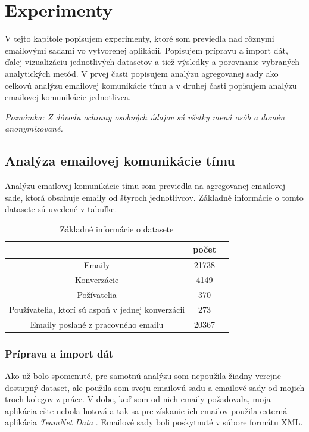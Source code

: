 \documentclass[slovak,master,public,dept460,male,cpdeclaration,oneside]{diploma}
\begin{document}
\section{Experimenty}
V tejto kapitole popisujem experimenty, ktoré som previedla nad rôznymi emailovými sadami vo vytvorenej aplikácii. Popisujem prípravu a import dát, ďalej vizualizáciu jednotlivých datasetov a tiež výsledky a porovnanie vybraných analytických metód. V prvej časti popisujem analýzu agregovanej sady ako celkovú analýzu emailovej komunikácie tímu a v druhej časti popisujem analýzu emailovej komunikácie jednotlivca.

\noindent \textit{Poznámka: Z dôvodu ochrany osobných údajov sú všetky mená osôb a domén anonymizované.}


\subsection{Analýza emailovej komunikácie tímu}

Analýzu emailovej komunikácie tímu som previedla na agregovanej emailovej sade, ktorá obsahuje emaily od štyroch jednotlivcov. Základné informácie o tomto datasete sú uvedené v tabuľke. 

\begin{table}[h!]
\centering
\begin{tabular}{ c c c }
  &  počet \\ 
 \hline
 Emaily  & 21738 \\  
 Konverzácie  & 4149  \\
 Požívatelia  & 370 \\
 Používatelia, ktorí sú aspoň v jednej konverzácii  & 273 \\  
 Emaily poslané z pracovného emailu  & 20367  \\
\end{tabular}
\caption{Základné informácie o datasete}
\label{tabulkazaklinfo}
\end{table} 

\subsubsection{Príprava a import dát}
Ako už bolo spomenuté, pre samotnú analýzu som nepoužila žiadny verejne dostupný dataset, ale použila som svoju emailovú sadu a emailové sady od mojich troch kolegov z práce. V dobe, keď som od nich emaily požadovala, moja aplikácia ešte nebola hotová a tak sa pre získanie ich emailov použila externá aplikácia \textit{TeamNet Data} \cite{5}. Emailové sady boli poskytnuté v súbore formátu XML.
\end{document}
